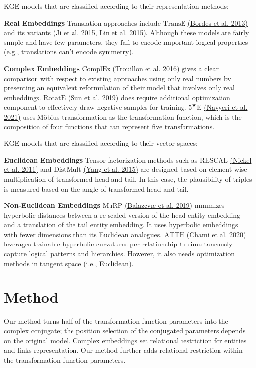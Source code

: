 \documentclass[11pt]{article}
\begin{document}
KGE models that are classified according to their representation methods:

\textbf{Real Embeddings} Translation approaches include $\mathrm{TransE}$ 
\hyperlink{Bor13}{(Bordes et al. 2013)} 
and its variants 
(\hyperlink{Jie15}{Ji et al. 2015}, 
\hyperlink{Lin15}{Lin et al. 2015}).
Although these models are fairly simple and have few parameters, they fail to encode important logical properties (e.g., translations can't encode symmetry).

\textbf{Complex Embeddings} $\mathrm{ComplEx}$ 
\hyperlink{Tro16}{(Trouillon et al. 2016)} gives a clear comparison with respect to existing approaches using only real numbers by presenting an equivalent reformulation of their model that involves only real embeddings.
$\mathrm{RotatE}$ 
\hyperlink{Sun19}{(Sun et al. 2019)} does require additional optimization component to effectively draw negative samples for training.
$5^{\bigstar}\mathrm{E}$ 
\hyperlink{Nay21}{(Nayyeri et al. 2021)}
uses Möbius transformation as the transformation function, which is the composition of four functions that can represent five transformations. 

KGE models that are classified according to their vector spaces:

\textbf{Euclidean Embeddings} Tensor factorization methods such as $\mathrm{RESCAL}$ 
\hyperlink{Nic11}{(Nickel et al. 2011)} and $\mathrm{DistMult}$ 
\hyperlink{Yan15}{(Yang et al. 2015)}
are designed based on element-wise multiplication of transformed head and tail. 
In this case, the plausibility of triples is measured based on the angle of transformed head and tail.

\textbf{Non-Euclidean Embeddings} $\mathrm{MuRP}$ 
\hyperlink{Bal19}{(Balazevic et al. 2019)}
minimizes hyperbolic distances between a re-scaled version of the head entity embedding and a translation of the tail entity embedding. 
It uses hyperbolic embeddings with fewer dimensions than its Euclidean analogues.
$\mathrm{ATTH}$ 
\hyperlink{Cha20}{(Chami et al. 2020)}
leverages trainable hyperbolic curvatures per relationship to simultaneously capture logical patterns and hierarchies.
However, it also needs optimization methods in tangent space (i.e., Euclidean).

\section{Method}
Our method turns half of the transformation function parameters into the complex conjugate; 
the position selection of the conjugated parameters depends on the original model.
Complex embeddings set relational restriction for entities and links representation.
Our method further adds relational restriction within the transformation function parameters.
\end{document}
